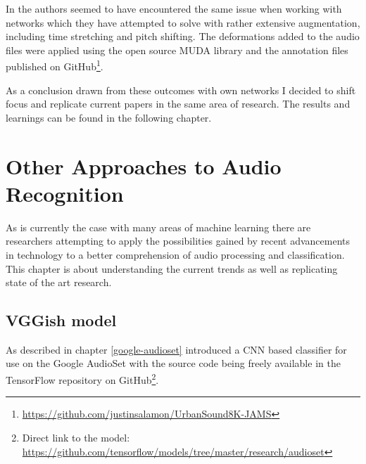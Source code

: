 In \cite{DBLP:journals/corr/SalamonB16} the authors seemed to have encountered the same issue when working with networks which they have attempted to solve with rather extensive augmentation, including time stretching and pitch shifting. The deformations added to the audio files were applied using the open source MUDA library \cite{mcfee2015-augmentation} and the annotation files published on GitHub\footnote{\url{https://github.com/justinsalamon/UrbanSound8K-JAMS}}.

As a conclusion drawn from these outcomes with own networks I decided to shift focus and replicate current papers in the same area of research. The results and learnings can be found in the following chapter.













\chapter{Other Approaches to Audio Recognition}

As is currently the case with many areas of machine learning there are researchers attempting to apply the possibilities gained by recent advancements in technology to a better comprehension of audio processing and classification. This chapter is about understanding the current trends as well as replicating state of the art research.

\section{VGGish model}
\label{vggish}


As described in chapter \ref{google-audioset} \cite{45611} introduced a CNN based classifier for use on the Google AudioSet with the source code being freely available in the TensorFlow repository on GitHub\footnote{Direct link to the model: \url{https://github.com/tensorflow/models/tree/master/research/audioset}}.

